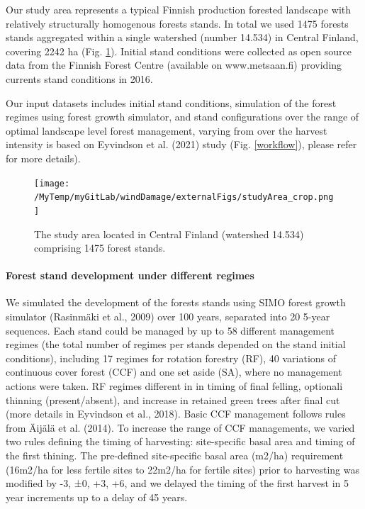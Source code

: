 \documentclass[]{elsarticle} %
\begin{document}
Our study area represents a typical Finnish production forested
landscape with relatively structurally homogenous forests stands. In
total we used 1475 forests stands aggregated within a single watershed
(number 14.534) in Central Finland, covering 2242 ha (Fig.
\ref{study_area}). Initial stand conditions were collected as open
source data from the Finnish Forest Centre (available on www.metsaan.fi)
providing currents stand conditions in 2016.

Our input datasets includes initial stand conditions, simulation of the
forest regimes using forest growth simulator, and stand configurations
over the range of optimal landscape level forest management, varying
from over the harvest intensity is based on Eyvindson et al. (2021)
study (Fig. \ref{workflow}), please refer for more details).

\begin{figure}
\centering
\texttt{[image: /MyTemp/myGitLab/windDamage/externalFigs/studyArea\_crop.png]}
\caption{The study area located in Central Finland (watershed 14.534)
comprising 1475 forest stands.\label{study_area}}
\end{figure}

\paragraph{Forest stand development under different
regimes}\label{forest-stand-development-under-different-regimes}

We simulated the development of the forests stands using SIMO forest
growth simulator (Rasinmäki et al., 2009) over 100 years, separated into
20 5-year sequences. Each stand could be managed by up to 58 different
management regimes (the total number of regimes per stands depended on
the stand initial conditions), including 17 regimes for rotation
forestry (RF), 40 variations of continuous cover forest (CCF) and one
set aside (SA), where no management actions were taken. RF regimes
different in in timing of final felling, optionali thinning
(present/absent), and increase in retained green trees after final cut
(more details in Eyvindson et al., 2018). Basic CCF management follows
rules from Äijälä et al. (2014). To increase the range of CCF
managements, we varied two rules defining the timing of harvesting:
site-specific basal area and timing of the first thining. The
pre-defined site-specific basal area (m2/ha) requirement (16m2/ha for
less fertile sites to 22m2/ha for fertile sites) prior to harvesting was
modified by -3, ±0, +3, +6, and we delayed the timing of the first
harvest in 5 year increments up to a delay of 45 years.
\end{document}
